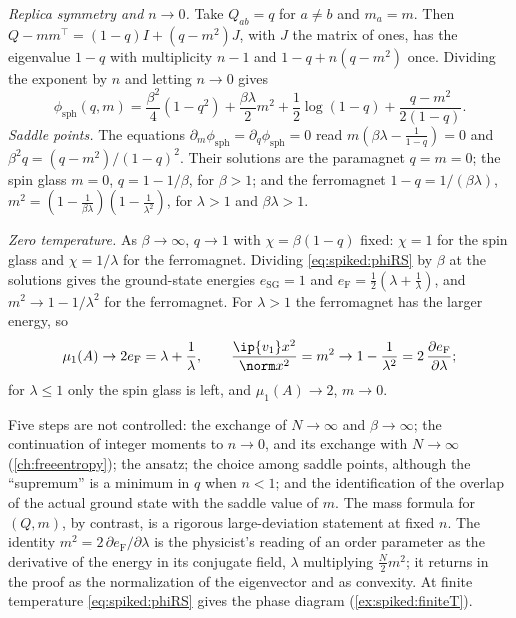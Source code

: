 \begin{refsection}
\begin{heuristic}
\emph{Replica symmetry and $n\to0$.} Take $Q_{ab}=q$ for $a\ne b$ and $m_a=m$. Then $Q-mm^\top=(1-q)I+(q-m^2)J$, with $J$ the matrix of ones, has the eigenvalue $1-q$ with multiplicity $n-1$ and $1-q+n(q-m^2)$ once. Dividing the exponent by $n$ and letting $n\to0$ gives
\begin{equation}\label{eq:spiked:phiRS}
\phi_{\mathrm{sph}}(q,m)=\frac{\beta^2}4(1-q^2)+\frac{\beta\lambda}2m^2+\frac12\log(1-q)+\frac{q-m^2}{2(1-q)}.
\end{equation}
\emph{Saddle points.} The equations $\partial_m\phi_{\mathrm{sph}}=\partial_q\phi_{\mathrm{sph}}=0$ read $m(\beta\lambda-\frac1{1-q})=0$ and $\beta^2q=(q-m^2)/(1-q)^2$. Their solutions are the paramagnet $q=m=0$; the spin glass $m=0$, $q=1-1/\beta$, for $\beta>1$; and the ferromagnet $1-q=1/(\beta\lambda)$, $m^2=(1-\frac1{\beta\lambda})(1-\frac1{\lambda^2})$, for $\lambda>1$ and $\beta\lambda>1$.

\emph{Zero temperature.} As $\beta\to\infty$, $q\to1$ with $\chi=\beta(1-q)$ fixed: $\chi=1$ for the spin glass and $\chi=1/\lambda$ for the ferromagnet. Dividing \eqref{eq:spiked:phiRS} by $\beta$ at the solutions gives the ground-state energies $e_{\mathrm{SG}}=1$ and $e_{\mathrm F}=\frac12(\lambda+\frac1\lambda)$, and $m^2\to1-1/\lambda^2$ for the ferromagnet. For $\lambda>1$ the ferromagnet has the larger energy, so
\[
\mu_1(A)\to2e_{\mathrm F}=\lambda+\frac1\lambda,\qquad\frac{\ip{v_1}x^2}{\norm x^2}=m^2\to1-\frac1{\lambda^2}=2\,\frac{\partial e_{\mathrm F}}{\partial\lambda};
\]
for $\lambda\le1$ only the spin glass is left, and $\mu_1(A)\to2$, $m\to0$.
\end{heuristic}

Five steps are not controlled: the exchange of $N\to\infty$ and $\beta\to\infty$; the continuation of integer moments to $n\to0$, and its exchange with $N\to\infty$ (\cref{ch:freeentropy}); the ansatz; the choice among saddle points, although the \enquote{supremum} is a minimum in $q$ when $n<1$; and the identification of the overlap of the actual ground state with the saddle value of $m$. The mass formula for $(Q,m)$, by contrast, is a rigorous large-deviation statement at fixed $n$. The identity $m^2=2\,\partial e_{\mathrm F}/\partial\lambda$ is the physicist's reading of an order parameter as the derivative of the energy in its conjugate field, $\lambda$ multiplying $\frac N2m^2$; it returns in the proof as the normalization of the eigenvector and as convexity. At finite temperature \eqref{eq:spiked:phiRS} gives the phase diagram (\cref{ex:spiked:finiteT}).


\end{refsection}
